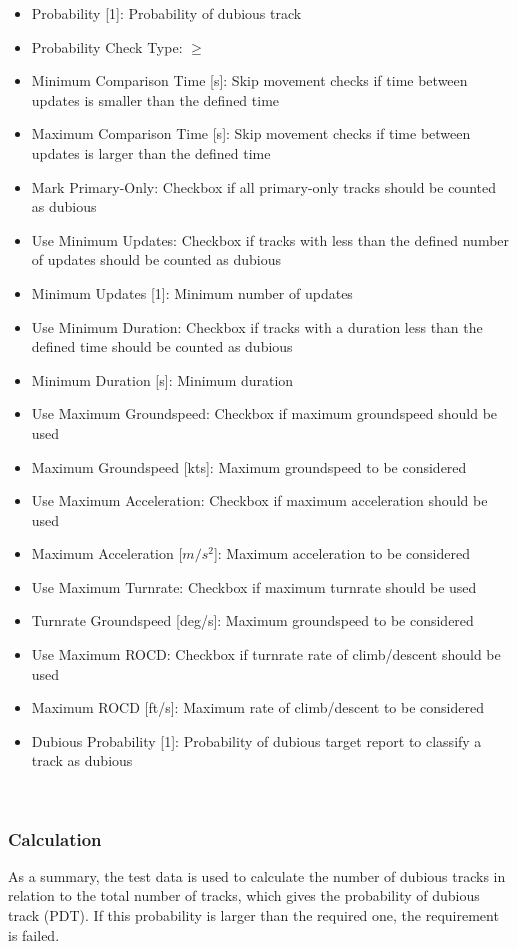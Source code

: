 \begin{itemize}  
\item Probability [1]: Probability of dubious track
\item Probability Check Type: $\geq$
\item Minimum Comparison Time [s]: Skip movement checks if time between updates is smaller than the defined time
\item Maximum Comparison Time [s]: Skip movement checks if time between updates is larger than the defined time
\item Mark Primary-Only: Checkbox if all primary-only tracks should be counted as dubious
\item Use Minimum Updates: Checkbox if tracks with less than the defined number of updates should be counted as dubious
\item Minimum Updates [1]: Minimum number of updates
\item Use Minimum Duration: Checkbox if tracks with a duration less than the defined time should be counted as dubious
\item Minimum Duration [s]: Minimum duration
\item Use Maximum Groundspeed: Checkbox if maximum groundspeed should be used
\item Maximum Groundspeed [kts]: Maximum groundspeed to be considered
\item Use Maximum Acceleration: Checkbox if maximum acceleration should be used
\item Maximum Acceleration [$m/s^{2}$]: Maximum acceleration to be considered
\item Use Maximum Turnrate: Checkbox if maximum turnrate should be used
\item Turnrate Groundspeed [deg/s]: Maximum groundspeed to be considered
\item Use Maximum ROCD: Checkbox if turnrate rate of climb/descent should be used
\item Maximum ROCD [ft/s]: Maximum  rate of climb/descent to be considered
\item Dubious Probability [1]: Probability of dubious target report to classify a track as dubious
\end{itemize}
\ \\

\subsubsection{Calculation}

As a summary, the test data is used to calculate the number of dubious tracks in relation to the total number of tracks, which gives the probability of dubious track (PDT). If this probability is larger than the required one, the requirement is failed. \\

